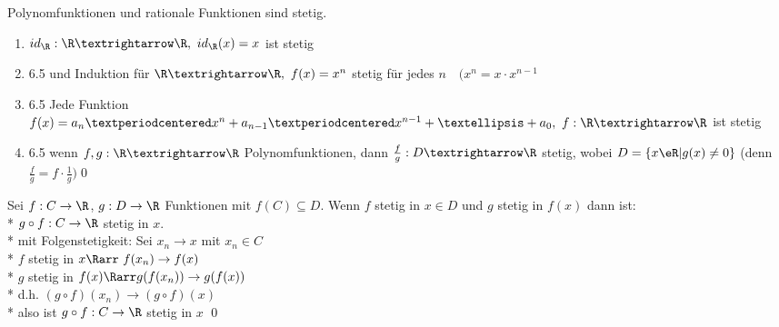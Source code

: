 Polynomfunktionen und rationale Funktionen sind stetig.
\bew
\begin{enumerate}
\item{$id_{\R}:\R→\R,\ id_{\R}(x)=x$ ist stetig}
\item{6.5 und Induktion \Rarr{} für $\R→\R,\ f(x)=x^n$ stetig für jedes $n\quad (x^n=x·x^{n-1}$}
\item{6.5 \Rarr{} Jede Funktion $f(x)=a_n·x^{n}+a_{n-1}·x^{n-1}+…+a_0,\ f:\R→\R$ ist stetig}
\item{6.5 \Rarr{} wenn $f,g:\R→\R$ Polynomfunktionen, dann $\frac{f}{g}:D→\R$ stetig, wobei $D=\{x\eR|g(x)\neq 0\}$ (denn $\frac{f}{g}=f·\frac{1}{g})$\qed}
\end{enumerate}

Sei $f: C \to \R$, $g: D \to \R$ Funktionen mit $f(C) \subseteq D$. Wenn $f$ stetig in $x \in D$ und $g$ stetig in $f(x)$ dann ist:\\*
$g \circ f: C \to \R$ stetig in $x$.\\*
\bew mit Folgenstetigkeit:
Sei $x_n \to x$ mit $x_n \in C$\\*
$f$ stetig in $x \Rarr \ f(x_n) \to f(x)$\\*
$g$ stetig in $f(x) \Rarr g(f(x_n)) \to g(f(x))$\\*
d.h. $(g \circ f)(x_n) \to (g \circ f)(x)$\\*
also ist $g \circ f: C \to \R$ stetig in $x$ \qed


